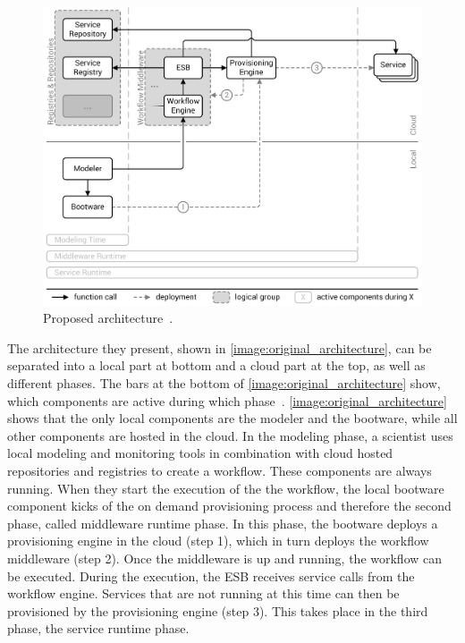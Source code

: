 \begin{figure}[!htbp]
	\centering
	\includegraphics[resolution=600]{previous/assets/original_architecture}
	\caption{Proposed architecture~\autocite[based on][]{provisioning:ondemand}.}
	\label{image:original_architecture}
\end{figure}

The architecture they present, shown in \autoref{image:original_architecture}, can be separated into a local part at bottom and a cloud part at the top, as well as different phases.
The bars at the bottom of \autoref{image:original_architecture} show, which components are active during which phase~\autocite{provisioning:ondemand}.
\autoref{image:original_architecture} shows that the only local components are the modeler and the bootware, while all other components are hosted in the cloud.
In the modeling phase, a scientist uses local modeling and monitoring tools in combination with cloud hosted repositories and registries to create a workflow.
These components are always running.
When they start the execution of the the workflow, the local bootware component kicks of the on demand provisioning process and therefore the second phase, called middleware runtime phase.
In this phase, the bootware deploys a provisioning engine in the cloud (step 1), which in turn deploys the workflow middleware (step 2).
Once the middleware is up and running, the workflow can be executed. During the execution, the ESB receives service calls from the workflow engine.
Services that are not running at this time can then be provisioned by the provisioning engine (step 3).
This takes place in the third phase, the service runtime phase.

